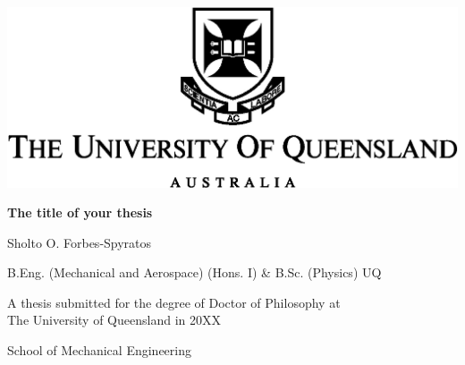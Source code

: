 
\thispagestyle{empty}

\begin{center}
  \includegraphics{figures/uq_logo}

  \vspace{50pt}

  \textbf{\Large The title of your thesis}

  \vspace{25pt}

  {\large Sholto O. Forbes-Spyratos}

  \vspace{5pt}

  {\large B.Eng. (Mechanical and Aerospace) (Hons. I) \& B.Sc. (Physics) UQ} \newline


  \vspace{60pt}
                                                                                                                                                                                                                                                                                                                                                                                                                                                                                                                                                                                                                                                                                                                                                                                                                                                                                                                                                                                                                                                 
  \vfill

  {\large A thesis submitted for the degree of Doctor of Philosophy at\\ The University of Queensland in 20XX}

  \vspace{20pt}

  School of Mechanical Engineering

  \vfill
\end{center}

